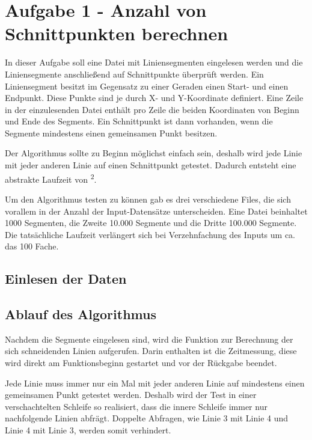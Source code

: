 \section{Aufgabe 1 - Anzahl von Schnittpunkten berechnen}
\label{sec:Aufgabe1}
In dieser Aufgabe soll eine Datei mit Liniensegmenten eingelesen werden und die Liniensegmente anschlie{\ss}end auf Schnittpunkte überprüft werden. Ein Liniensegment besitzt im Gegensatz zu einer Geraden einen Start- und einen Endpunkt. Diese Punkte sind je durch X- und Y-Koordinate definiert. Eine Zeile in der einzulesenden Datei enthält pro Zeile die beiden Koordinaten von Beginn und Ende des Segments. Ein Schnittpunkt ist dann vorhanden, wenn die Segmente mindestens einen gemeinsamen Punkt besitzen.

Der Algorithmus sollte zu Beginn möglichst einfach sein, deshalb wird jede Linie mit jeder anderen Linie auf einen Schnittpunkt getestet. Dadurch entsteht eine abstrakte Laufzeit von \textsuperscript{2}\text{)}.

Um den Algorithmus testen zu können gab es drei verschiedene Files, die sich vorallem in der Anzahl der Input-Datensätze unterscheiden. Eine Datei beinhaltet 1000 Segmenten, die Zweite 10.000 Segmente und die Dritte 100.000 Segmente. Die tatsächliche Laufzeit verlängert sich bei Verzehnfachung des Inputs um ca. das 100 Fache.

\subsection{Einlesen der Daten}
\label{subsec:A1_EinlesenDaten}



\subsection{Ablauf des Algorithmus}
\label{subsec:A1_Algorithmus}
Nachdem die Segmente eingelesen sind, wird die Funktion zur Berechnung der sich schneidenden Linien aufgerufen. Darin enthalten ist die Zeitmessung, diese wird direkt am Funktionsbeginn gestartet und vor der Rückgabe beendet. 

Jede Linie muss immer nur ein Mal mit jeder anderen Linie auf mindestens einen gemeinsamen Punkt getestet werden. Deshalb wird der Test in einer verschachtelten Schleife so realisiert, dass die innere Schleife immer nur nachfolgende Linien abfrägt. Doppelte Abfragen, wie Linie 3 mit Linie 4 und Linie 4 mit Linie 3, werden somit verhindert.


